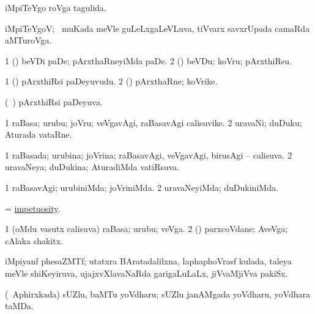 \bentry
{}
\gl{\gu}
\bmng
iMpiTeYgo roVga tagulida. 
\emng
\eentry

\bentry
{}
\gl{\nA}
\bmng
iMpiTeYgoV; \kanmu\ muKada meVle guLeLxgaLeVLuva, tiVvarx savxrUpada camaRda aMTuroVga. 
\emng
\eentry

\bentry
{}
\gl{\sakirx}
\bmng
\bnum
\num{1} (\deVva) beVDi paDe; pArxthaRneyiMda paDe. 
\num{2} (\viparx) beVDu; koVru; pArxthiRsu. 
\enum
\emng
\eentry

\bentry
{}
\gl{\nA}
\bmng
\bnum
\num{1} (\deVva) pArxthiRsi paDeyuvudu. 
\num{2} (\viparx) pArxthaRne; koVrike. 
\enum
\emng
\eentry

\bentry
{}
\gl{\gu}
\bmng
(\kanmu\ \deVva) pArxthiRsi paDeyuva. 
\emng
\eentry

\bentry
{}
\gl{\nA}
\bmng
\bnum
\num{1} raBasa; urubu; joVru; veVgavAgi, raBasavAgi calisuvike. 
\num{2} uravaNi; duDuku; Aturada vataRne. 
\enum
\emng
\eentry

\bentry
{}
\gl{\gu}
\bmng
\bnum
\num{1} raBasada; urubina; joVrina; raBasavAgi, veVgavAgi, birusAgi -- calisuva. 
\num{2} uravaNeya; duDukina; AturadiMda vatiRsuva. 
\enum
\emng
\eentry

\bentry
{}
\gl{\kirxvi}
\bmng
\bnum
\num{1} raBasavAgi; urubiniMda; joVriniMda. 
\num{2} uravaNeyiMda; duDukiniMda. 
\enum
\emng
\eentry

\bentry
{}
\gl{\nA}
\bmng
 = \hyperlink{impetuosity}{impetuosity}. 
\emng
\eentry

\bentry
{}
\gl{\nA}
\bmng
\bnum
\num{1} (oMdu vasutx calisuva) raBasa; urubu; veVga. 
\num{2} (\rUpa) parxcoVdane; AveVga; cAlaka shakitx. 
\enum
\emng
\eentry

\bentry
{}
\gl{\nA}
\bmng
iMpiyanf phesaZMTf; utatxra BAratadalilxna, laphaphoVrasf kulada, taleya meVle shiKeyiruva, ujajxvXlavaNaRda garigaLuLaLx, jiVvaMjiVva pakiSx. 
\emng
\eentry

\bentry
{}
\gl{\nA}
\bmng
(\da\ Aphirxkada) sUZlu, baMTu yoVdharu; sUZlu janAMgada yoVdharu, yoVdhara taMDa. 
\emng
\eentry

